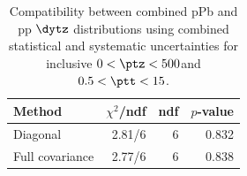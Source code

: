 \begin{table}[htp!]
\centering
\begin{tabular}{|l|r|r|r|}
\hline
Method & $\chi^2$/ndf & ndf & $p$-value \\
\hline
Diagonal & 2.81/6 & 6 & 0.832 \\
Full covariance & 2.77/6 & 6 & 0.838 \\
\hline
\end{tabular}
\caption{Compatibility between combined pPb and pp $\dytz$ distributions using combined statistical and systematic uncertainties for inclusive $0 < \ptz < 500$\GeV and $0.5 < \ptt < 15$\GeV.}
\label{table:chisq_deta}
\end{table}
